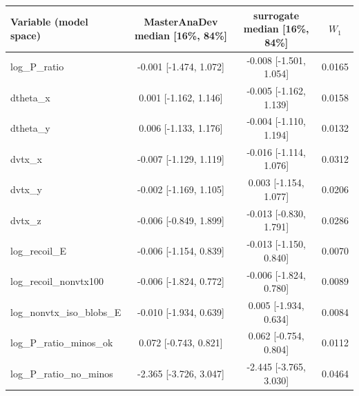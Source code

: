\begin{tabular}{lccc}
\toprule
Variable (model space) & MasterAnaDev median [16\%, 84\%] & surrogate median [16\%, 84\%] & $W_1$ \\
\midrule
log\_P\_ratio & -0.001 [-1.474, 1.072] & -0.008 [-1.501, 1.054] & 0.0165 \\
dtheta\_x & 0.001 [-1.162, 1.146] & -0.005 [-1.162, 1.139] & 0.0158 \\
dtheta\_y & 0.006 [-1.133, 1.176] & -0.004 [-1.110, 1.194] & 0.0132 \\
dvtx\_x & -0.007 [-1.129, 1.119] & -0.016 [-1.114, 1.076] & 0.0312 \\
dvtx\_y & -0.002 [-1.169, 1.105] & 0.003 [-1.154, 1.077] & 0.0206 \\
dvtx\_z & -0.006 [-0.849, 1.899] & -0.013 [-0.830, 1.791] & 0.0286 \\
log\_recoil\_E & -0.006 [-1.154, 0.839] & -0.013 [-1.150, 0.840] & 0.0070 \\
log\_recoil\_nonvtx100 & -0.006 [-1.824, 0.772] & -0.006 [-1.824, 0.780] & 0.0089 \\
log\_nonvtx\_iso\_blobs\_E & -0.010 [-1.934, 0.639] & 0.005 [-1.934, 0.634] & 0.0084 \\
log\_P\_ratio\_minos\_ok & 0.072 [-0.743, 0.821] & 0.062 [-0.754, 0.804] & 0.0112 \\
log\_P\_ratio\_no\_minos & -2.365 [-3.726, 3.047] & -2.445 [-3.765, 3.030] & 0.0464 \\
\bottomrule
\end{tabular}

